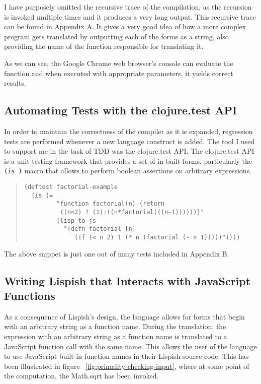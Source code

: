 I have purposely omitted the recursive trace of the compilation, as the recursion is invoked multiple times and it produces a very long output. 
This recursive trace can be found in Appendix A. It gives a very good idea of how a more complex program gets translated by outputting each of the forms as a string, also providing the name of the function responsible for translating it. 

As we can see, the Google Chrome web browser's console can evaluate the function and when executed with appropriate parameters, it yields correct results. 

\subsection{Automating Tests with the clojure.test API}
In order to maintain the correctness of the compiler as it is expanded, regression tests are performed whenever a new language construct is added. 
The tool I used to support me in the task of TDD was the clojure.test API.
The clojure.test API\cite{clojure.test:2011:Site} is a unit testing framework that provides a set of in-built forms, particularly the \texttt{(is )} macro that allows to perform boolean assertions on arbitrary expressions. 

\begin{quote}
\begin{verbatim}
(deftest factorial-example
  (is (= 
         "function factorial(n) {return 
          ((n<2) ? (1):((n*factorial(((n-1))))))}"
         (lisp-to-js 
           "(defn factorial [n] 
              (if (< n 2) 1 (* n (factorial (- n 1)))))"))))
\end{verbatim}
\end{quote}

The above snippet is just one out of many tests included in Appendix B. 

\subsection{Writing Lispish that Interacts with JavaScript Functions}
As a consequence of Lispish's design, the language allows for forms that begin with an arbitrary string as a function name. During the translation, the expression with an arbitrary string as a function name is translated to a JavaScript function call with the same name. This allows the user of the language to use JavaScript built-in function names in their Lispish source code. This has been illustrated in figure ~\ref{fig:primality-checking-input}, where at some point of the computation, the Math.sqrt has been invoked. 

